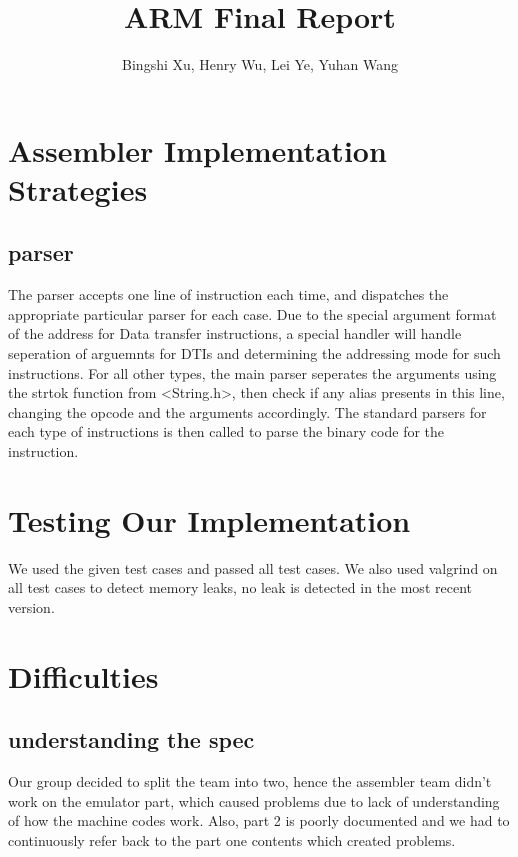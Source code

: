 \documentclass[11pt]{article}
\begin{document}
\title{ARM Final Report}
\author{Bingshi Xu, Henry Wu, Lei Ye, Yuhan Wang}

\maketitle

\section{Assembler Implementation Strategies}

\subsection{parser}
The parser accepts one line of instruction each time, and dispatches the appropriate particular parser for each case.
Due to the special argument format of the address for Data transfer instructions, a special handler will handle seperation of arguemnts for DTIs and determining the 
addressing mode for such instructions. For all other types, the main parser seperates the arguments using the strtok function from <String.h>, then check if any alias presents in 
this line, changing the opcode and the arguments accordingly. The standard parsers for each type of instructions is then called to parse the binary code for the instruction.
 



\section{Testing Our Implementation}

We used the given test cases and passed all test cases.
We also used valgrind on all test cases to detect memory leaks, no leak is detected in the most recent version.

\section{Difficulties}
\subsection{understanding the spec}
Our group decided to split the team into two, hence the assembler team didn't work on the emulator part, which caused problems due to lack of understanding of how the machine codes work.
Also, part 2 is poorly documented and we had to continuously refer back to the part one contents which created problems.
\end{document}
